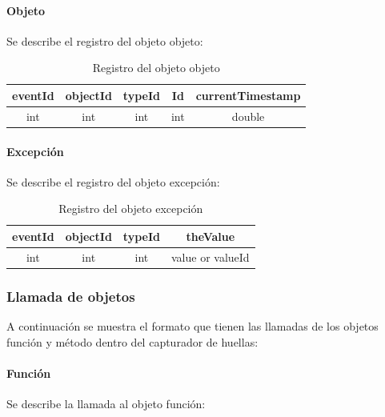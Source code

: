 \documentclass[12pt,legalpaper]{report}
\begin{document}
				\paragraph{Objeto}

Se describe el registro del objeto objeto: \\

\begin{table}[!h]
\begin{center}
\begin{tabular}{| c | c | c | c | c |}
\hline
\rowcolor[gray]{0.9}eventId & objectId & typeId & Id & currentTimestamp\\
\hline
int & int & int & int & double\\
\hline
\end{tabular}
\caption{Registro del objeto objeto} 
\end{center}
\end{table}
				\paragraph{Excepción}

Se describe el registro del objeto excepción: \\

\begin{table}[!h]
\begin{center}
\begin{tabular}{| c | c | c | c |}
\hline
\rowcolor[gray]{0.9}eventId & objectId & typeId & theValue\\
\hline
int & int & int & value or valueId\footnotemark[1]\\
\hline
\end{tabular}
\caption{Registro del objeto excepción} 
\end{center}
\end{table}



			\subsubsection{Llamada de objetos}

A continuación se muestra el formato que tienen las llamadas de los objetos función y método dentro del capturador de huellas:\\

				\paragraph{Función}
Se describe la llamada al objeto función:\\
\end{document}
